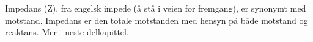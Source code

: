 Impedans (Z), fra engelsk impede (å stå i veien for fremgang),
er synonymt med motstand.
Impedans er den totale motstanden
med hensyn på både motstand og reaktans.
Mer i neste delkapittel.
